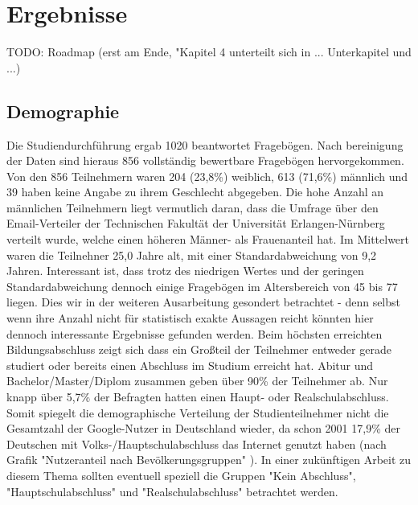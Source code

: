 %
% 

\chapter{Ergebnisse}

TODO: Roadmap (erst am Ende, "Kapitel 4 unterteilt sich in ... Unterkapitel und ...)

\section{Demographie}
\label{sec:demo}
Die Studiendurchführung ergab 1020 beantwortet Fragebögen. Nach bereinigung der Daten sind hieraus 856 vollständig bewertbare Fragebögen hervorgekommen.
Von den 856 Teilnehmern waren 204 (23,8\%) weiblich, 613 (71,6\%) männlich und 39 haben keine Angabe zu ihrem Geschlecht abgegeben. Die hohe Anzahl an männlichen Teilnehmern liegt vermutlich daran, dass die Umfrage über den Email-Verteiler der Technischen Fakultät der Universität Erlangen-Nürnberg verteilt wurde, welche einen höheren Männer- als Frauenanteil hat.
Im Mittelwert waren die Teilnehner 25,0 Jahre alt, mit einer Standardabweichung von 9,2 Jahren.
Interessant ist, dass trotz des niedrigen Wertes und der geringen Standardabweichung dennoch einige Fragebögen im Altersbereich von 45 bis 77 liegen. Dies wir in der weiteren Ausarbeitung gesondert betrachtet - denn selbst wenn ihre Anzahl nicht für statistisch exakte Aussagen reicht könnten hier dennoch interessante Ergebnisse gefunden werden.
Beim höchsten erreichten Bildungsabschluss zeigt sich dass ein Großteil der Teilnehmer entweder gerade studiert oder bereits einen Abschluss im Studium erreicht hat. Abitur und Bachelor/Master/Diplom zusammen geben über 90\% der Teilnehmer ab. Nur knapp über 5,7\% der Befragten hatten einen Haupt- oder Realschulabschluss.
Somit spiegelt die demographische Verteilung der Studienteilnehmer nicht die Gesamtzahl der Google-Nutzer in Deutschland wieder, da schon 2001 17,9\% der Deutschen mit Volks-/Hauptschulabschluss das Internet genutzt haben (nach Grafik "Nutzeranteil nach Bevölkerungsgruppen" \cite{ard2001internetusage}). In einer zukünftigen Arbeit zu diesem Thema sollten eventuell speziell die Gruppen "Kein Abschluss", "Hauptschulabschluss" und "Realschulabschluss" betrachtet werden.

